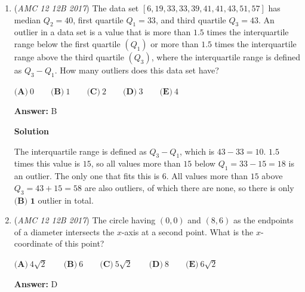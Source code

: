 \begin{enumerate}
 



\textbf{Solution 4}

Since the distance traveled by bicycle and foot are equal, we can substitute the time traveled by bike, or $b$, as $\frac{5}{17}$ of the time traveled by foot, or $f$

 Accordingly, we have $\frac{22}{17}f=44$This comes out to $f=34$This means that Samia traveled $34$ minutes on foot, and hence, $44-34=10$ minutes on bicycle

 Because $10$ minutes on bike yields $\frac{17}{6}$ kilometers, and distance on bike = distance on foot, we have the final answer of $\frac{17}{6} \approx \boxed{2.8}$



	\item (\textit{AMC 12 12B 2017}) The data set $[6,19,33,33,39,41,41,43,51,57]$ has median $Q_2 = 40$, first quartile $Q_1 = 33$, and third quartile $Q_3=43$. An outlier in a data set is a value that is more than $1.5$ times the interquartile range below the first quartile $(Q_1)$ or more than $1.5$ times the interquartile range above the third quartile $(Q_3)$, where the interquartile range is defined as $Q_3 - Q_1$. How many outliers does this data set have?


 $\textbf{(A)}\ 0\qquad\textbf{(B)}\ 1\qquad\textbf{(C)}\ 2\qquad\textbf{(D)}\ 3\qquad\textbf{(E)}\ 4$

 \textbf{Answer: }B



\textbf{Solution}

The interquartile range is defined as $Q_3 - Q_1$, which is $43 - 33 = 10$. $1.5$ times this value is $15$, so all values more than $15$ below $Q_1 = 33 - 15 = 18$ is an outlier. The only one that fits this is $6$. All values more than $15$ above $Q_3 = 43 + 15 = 58$ are also outliers, of which there are none, so there is only $\boxed{\textbf{(B) 1}}$ outlier in total.

 


	\item (\textit{AMC 12 12B 2017}) The circle having $(0,0)$ and $(8,6)$ as the endpoints of a diameter intersects the $x$-axis at a second point. What is the $x$-coordinate of this point? 


 $\textbf{(A)}\ 4\sqrt{2} \qquad \textbf{(B)}\ 6\qquad \textbf{(C)}\ 5\sqrt{2}\qquad \textbf{(D)}\ 8\qquad \textbf{(E)}\ 6\sqrt{2}$

 \textbf{Answer: }D




\end{enumerate}
